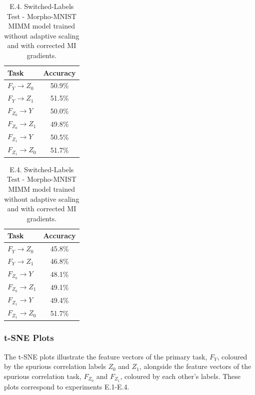\documentclass[12pt,DIV14,BCOR12mm,a4paper,footinclude=false,headinclude,parskip=half-,twoside,openright,cleardoublepage=empty,toc=index,bibliography=totoc,listof=totoc]{scrreprt}
\numberwithin{equation}{chapter}
\begin{document}
\begin{table}[H]
\centering
\begin{minipage}{.45\linewidth}
\centering
\begin{tabular}{|l|c|}
\hline
\textbf{Task} & \textbf{Accuracy} \\
\hline
$F_Y \rightarrow Z_0$ & 50.9\% \\
$F_Y \rightarrow Z_1$ & 51.5\% \\
\hline
$F_{Z_0} \rightarrow Y$ & 50.0\% \\
$F_{Z_0} \rightarrow Z_1$ & 49.8\% \\
\hline
$F_{Z_1} \rightarrow Y$ & 50.5\% \\
$F_{Z_1} \rightarrow Z_0$ & 51.7\% \\
\hline
\end{tabular}
\caption{E.3. Switched-Labels Test - Morpho-MNIST MIMM model trained with adaptive scaling and without corrected MI gradients.}
\label{tab:accuracy_tasks-mmnist_MIMM_ada_nocorr}
\end{minipage}%
\hfill
\begin{minipage}{.45\linewidth}
\centering
\begin{tabular}{|l|c|}
\hline
\textbf{Task} & \textbf{Accuracy} \\
\hline
$F_Y \rightarrow Z_0$ & 45.8\% \\
$F_Y \rightarrow Z_1$ & 46.8\% \\
\hline
$F_{Z_0} \rightarrow Y$ & 48.1\% \\
$F_{Z_0} \rightarrow Z_1$ & 49.1\% \\
\hline
$F_{Z_1} \rightarrow Y$ & 49.4\% \\
$F_{Z_1} \rightarrow Z_0$ & 51.7\% \\
\hline
\end{tabular}
\caption{E.4. Switched-Labels Test - Morpho-MNIST MIMM model trained without adaptive scaling and with corrected MI gradients.}
\label{tab:accuracy_tasks-mmnist_MIMM_noada_corr}
\end{minipage}%
\end{table}


\subsubsection{t-SNE Plots}

The t-SNE plots illustrate the feature vectors of the primary task, $F_Y$, coloured by the spurious correlation labels $Z_0$ and $Z_1$, alongside the feature vectors of the spurious correlation task, $F_{Z_0}$ and $F_{Z_1}$, coloured by each other's labels. These plots correspond to experiments E.1-E.4. 
\end{document}
